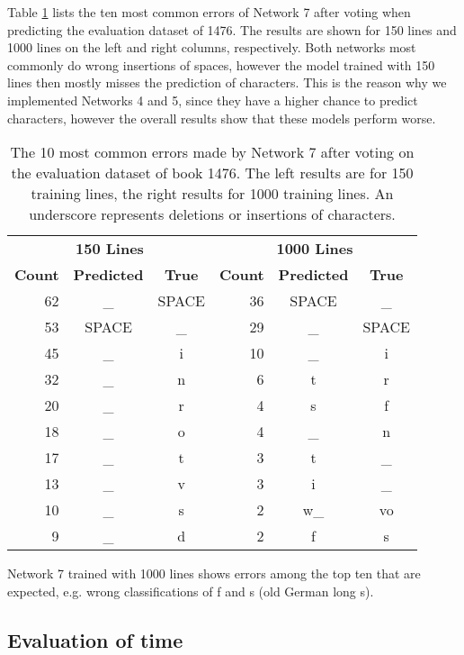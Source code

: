\documentclass{jlcl}
\def\longs{{\fontencoding{TS1}\selectfont s}}
\begin{document}
Table \ref{tab:confusion_errors} lists the ten most common errors of Network 7 after voting when predicting the evaluation dataset of 1476.
The results are shown for 150 lines and 1000 lines on the left and right columns, respectively.
Both networks most commonly do wrong insertions of spaces, however the model trained with 150 lines then mostly misses the prediction of characters.
This is the reason why we implemented Networks 4 and 5, since they have a higher chance to predict characters, however the overall results show that these models perform worse.
\begin{table}[t]
    \centering
    \caption{The 10 most common errors made by Network 7 after voting on the evaluation dataset of book 1476. The left results are for 150 training lines, the right results for 1000 training lines. An underscore represents deletions or insertions of characters.}
    \label{tab:confusion_errors}
    \begin{tabular}{r|cc||r|cc}
        \hline
        \multicolumn{3}{c||}{\textbf{150 Lines}} & \multicolumn{3}{c}{\textbf{1000 Lines}} \\
        \textbf{Count} & \textbf{Predicted} & \textbf{True} & \textbf{Count} & \textbf{Predicted} & \textbf{True} \\
        \hline
        62 & \_ & SPACE & 36 & SPACE & \_ \\
        53 & SPACE & \_ & 29 & \_ & SPACE \\
        45 & \_ & i &     10 & \_ & i \\
        32 & \_ & n &      6 & t & r \\
        20 & \_ & r &      4 & \longs & f\\
        18 & \_ & o &      4 & \_ & n \\
        17 & \_ & t &      3 & t & \_ \\
        13 & \_ & v &      3 & i & \_ \\
        10 & \_ & s &      2 & w\_ & vo \\
         9 & \_ & d &      2 & f & \longs \\
        \hline
    \end{tabular}
\end{table}
Network 7 trained with 1000 lines shows errors among the top ten that are expected, e.g. wrong classifications of f and \longs{} (old German long s).

\subsection{Evaluation of time}
\end{document}
